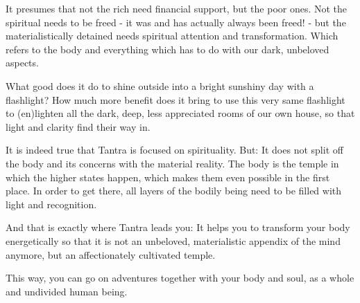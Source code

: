 It presumes that not the rich need financial support, but the poor ones. Not the spiritual needs to be freed - it was and has actually always been freed! - but the materialistically detained needs spiritual attention and transformation. Which refers to the body and everything which has to do with our dark, unbeloved aspects.

What good does it do to shine outside into a bright sunshiny day with a flashlight? How much more benefit does it bring to use this very same flashlight to (en)lighten all the dark, deep, less appreciated rooms of our own house, so that light and clarity find their way in.

It is indeed true that Tantra is focused on spirituality. But: It does not split off the body and its concerns with the material reality. The body is the temple in which the higher states happen, which makes them even possible in the first place. In order to get there, all layers of the bodily being need to be filled with light and recognition.

And that is exactly where Tantra leads you: It helps you to transform your body energetically so that it is not an unbeloved, materialistic appendix of the mind anymore, but an affectionately cultivated temple.

This way, you can go on adventures together with your body and soul, as a whole and undivided human being.
